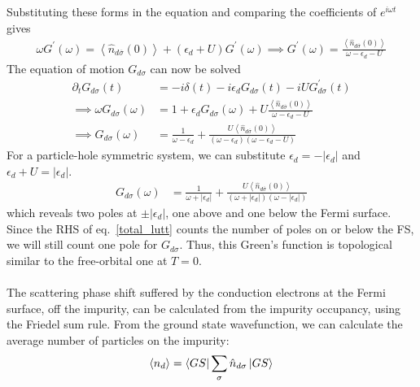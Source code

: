 \documentclass[twoside]{report}
\numberwithin{equation}{section}
\begin{document}
Substituting these forms in the equation and comparing the coefficients of \(e^{i\omega t}\) gives
\begin{equation}\begin{aligned}
	 \omega G^\prime(\omega) =  \left< \hat n_{d\overline\sigma}(0)\right> + \left( \epsilon_d + U \right) G^\prime(\omega)\implies G^\prime(\omega) = \frac{\left< \hat n_{d\overline\sigma}(0)\right>}{\omega - \epsilon_d - U}
\end{aligned}\end{equation}
The equation of motion \(G_{d\sigma}\) can now be solved
\begin{equation}\begin{aligned}
	\partial_t G_{d\sigma}(t) &= -i \delta(t) - i\epsilon_d G_{d\sigma}(t) - iU G^\prime_{d\sigma}(t)\\
	\implies \omega G_{d\sigma}(\omega) &= 1 + \epsilon_d G_{d\sigma}(\omega) + U\frac{\left< \hat n_{d\overline\sigma}(0)\right>}{\omega - \epsilon_d - U}\\
	\implies G_{d\sigma}(\omega) &= \frac{1}{\omega - \epsilon_d} + \frac{U\left< \hat n_{d\overline\sigma}(0)\right>}{\left( \omega - \epsilon_d \right) \left(\omega - \epsilon_d - U\right)}
\end{aligned}\end{equation}
For a particle-hole symmetric system, we can substitute \(\epsilon_d = -|\epsilon_d|\) and \(\epsilon_d + U = |\epsilon_d|\).
\begin{equation}\begin{aligned}
	G_{d\sigma}(\omega) &= \frac{1}{\omega + |\epsilon_d|} + \frac{U\left< \hat n_{d\overline\sigma}(0)\right>}{\left( \omega + |\epsilon_d| \right) \left(\omega - |\epsilon_d|\right)}
\end{aligned}\end{equation}
which reveals two poles at \(\pm |\epsilon_d|\), one above and one below the Fermi surface. Since the RHS of eq.~\ref{total_lutt} counts the number of poles on or below the FS, we will still count one pole for \(G_{d\sigma}\). Thus, this Green's function is topological similar to the free-orbital one at \(T=0\).
\\\\The scattering phase shift suffered by the conduction electrons at the Fermi surface, off the impurity, can be calculated from the impurity occupancy, using the Friedel sum rule. From the ground state wavefunction, we can calculate the average number of particles on the impurity:
\begin{equation}\begin{aligned}
	\left<n_d \right> = \bra{GS}\sum_\sigma \hat n_{d\sigma} \ket{GS}
\end{aligned}\end{equation}
\end{document}
